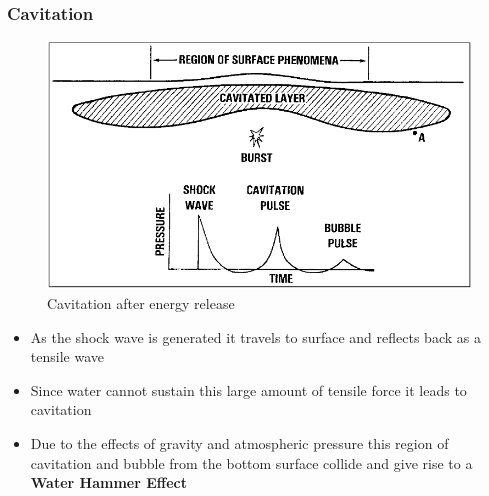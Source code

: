 \documentclass{beamer}
\begin{document}
\begin{frame}
\frametitle{Cavitation}
\begin{figure}[h]  
\begin{center}  
\includegraphics[scale=0.20]{3.png}
\caption{\tiny{Cavitation after energy release}}
\end{center}  
\end{figure}

\begin{itemize}
  \item As the shock wave is generated it travels to surface and reflects back as a tensile wave
  \item Since water cannot sustain this large amount of tensile force it leads to cavitation
  \item Due to the effects of gravity and atmospheric pressure this region of cavitation and bubble from the bottom surface collide and give rise to a \textbf{Water Hammer Effect}
\end{itemize}
\end{frame}


\end{document}
